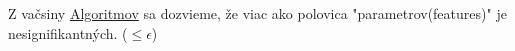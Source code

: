 \documentclass{article}
\begin{document}
Z vačsiny \href{https://github.com/adam-213/LinPro2021/blob/main/Results/L1_norm.txt}{Algoritmov} sa dozvieme, že viac ako polovica "parametrov(features)" je nesignifikantných. ($\leq \epsilon$)
\\\\\\\\\\\\\\\\\\\\\\
\\\\\\\\\\\\\\\\\\\\\\
\end{document}
